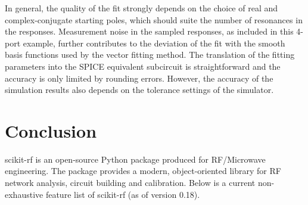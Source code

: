\documentclass[10pt, letterpaper]{scrartcl}
\newcommand{\skrf}{{s}cikit-rf\xspace}
\begin{document}
In general, the quality of the fit strongly depends on the choice of real and complex-conjugate starting poles, which should suite the number of resonances in the responses. Measurement noise in the sampled responses, as included in this 4-port example, further contributes to the deviation of the fit with the smooth basis functions used by the vector fitting method. The translation of the fitting parameters into the SPICE equivalent subcircuit is straightforward and the accuracy is only limited by rounding errors. However, the accuracy of the simulation results also depends on the tolerance settings of the simulator.

\section{Conclusion}
\skrf{} is an open-source Python package produced for RF/Microwave engineering. The package provides a modern, object-oriented library for RF network analysis, circuit building and calibration. Below is a current non-exhaustive feature list of \skrf{} (as of version 0.18).
\end{document}
